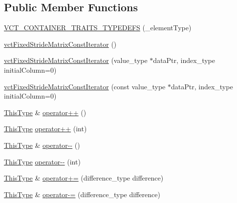 \subsection*{Public Member Functions}
\begin{DoxyCompactItemize}
\item 
\hyperlink{classvct_fixed_stride_matrix_const_iterator_a541c4cd5b94e8c08a1553a3c211848e7}{V\+C\+T\+\_\+\+C\+O\+N\+T\+A\+I\+N\+E\+R\+\_\+\+T\+R\+A\+I\+T\+S\+\_\+\+T\+Y\+P\+E\+D\+E\+F\+S} (\+\_\+element\+Type)
\item 
\hyperlink{classvct_fixed_stride_matrix_const_iterator_a4644c0f472f4c2a3806234f3b2450ce8}{vct\+Fixed\+Stride\+Matrix\+Const\+Iterator} ()
\item 
\hyperlink{classvct_fixed_stride_matrix_const_iterator_a5012cf6434dad743191cdb01ea629c04}{vct\+Fixed\+Stride\+Matrix\+Const\+Iterator} (value\+\_\+type $\ast$data\+Ptr, index\+\_\+type initial\+Column=0)
\item 
\hyperlink{classvct_fixed_stride_matrix_const_iterator_af63cd0ec36f1b4d439adad1d530ac4b4}{vct\+Fixed\+Stride\+Matrix\+Const\+Iterator} (const value\+\_\+type $\ast$data\+Ptr, index\+\_\+type initial\+Column=0)
\item 
\hyperlink{classvct_fixed_stride_matrix_const_iterator_a8c6ee7d655fb71d647506c3964a18e2c}{This\+Type} \& \hyperlink{classvct_fixed_stride_matrix_const_iterator_a7e3ed2cac501b2f99adcdd8e355e8cf8}{operator++} ()
\item 
\hyperlink{classvct_fixed_stride_matrix_const_iterator_a8c6ee7d655fb71d647506c3964a18e2c}{This\+Type} \hyperlink{classvct_fixed_stride_matrix_const_iterator_a73e40c4e9c90b8ab703ceb8aae6c0426}{operator++} (int)
\item 
\hyperlink{classvct_fixed_stride_matrix_const_iterator_a8c6ee7d655fb71d647506c3964a18e2c}{This\+Type} \& \hyperlink{classvct_fixed_stride_matrix_const_iterator_a19c6f1350bcf8d0db440f832870ddf4b}{operator-\/-\/} ()
\item 
\hyperlink{classvct_fixed_stride_matrix_const_iterator_a8c6ee7d655fb71d647506c3964a18e2c}{This\+Type} \hyperlink{classvct_fixed_stride_matrix_const_iterator_ab8a278eb0e02d3e98513890d2fb9f726}{operator-\/-\/} (int)
\item 
\hyperlink{classvct_fixed_stride_matrix_const_iterator_a8c6ee7d655fb71d647506c3964a18e2c}{This\+Type} \& \hyperlink{classvct_fixed_stride_matrix_const_iterator_a3abb15d006f47ef4e75603ea76baf028}{operator+=} (difference\+\_\+type difference)
\item 
\hyperlink{classvct_fixed_stride_matrix_const_iterator_a8c6ee7d655fb71d647506c3964a18e2c}{This\+Type} \& \hyperlink{classvct_fixed_stride_matrix_const_iterator_afedf18d6caeb6f8c73786852fab902b3}{operator-\/=} (difference\+\_\+type difference)

\end{DoxyCompactItemize}
